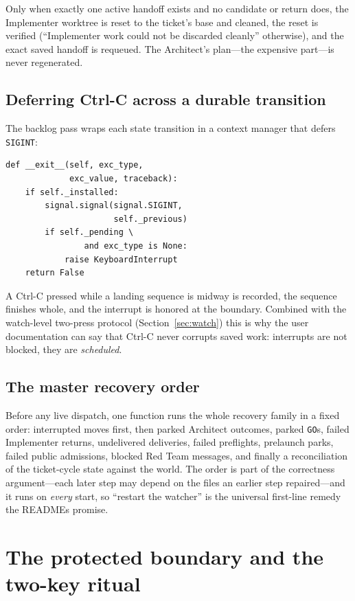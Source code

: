 \documentclass[10pt,aps,prd,twocolumn,nofootinbib]{revtex4-2}
\newcommand{\code}[1]{\texttt{#1}}
\begin{document}
Only when exactly one active handoff exists and no candidate or return
does, the Implementer worktree is reset to the ticket's base and
cleaned, the reset is verified (``Implementer work could not be
discarded cleanly'' otherwise), and the exact saved handoff is
requeued.  The Architect's plan---the expensive part---is never
regenerated.

\subsection{Deferring Ctrl-C across a durable transition}

The backlog pass wraps each state transition in a context manager that
defers \code{SIGINT}:

\begin{verbatim}
def __exit__(self, exc_type,
             exc_value, traceback):
    if self._installed:
        signal.signal(signal.SIGINT,
                      self._previous)
        if self._pending \
                and exc_type is None:
            raise KeyboardInterrupt
    return False
\end{verbatim}

A Ctrl-C pressed while a landing sequence is midway is recorded, the
sequence finishes whole, and the interrupt is honored at the
boundary.  Combined with the watch-level two-press protocol
(Section~\ref{sec:watch}) this is why the user documentation can say
that Ctrl-C never corrupts saved work: interrupts are not blocked,
they are \emph{scheduled}.

\subsection{The master recovery order}

Before any live dispatch, one function runs the whole recovery family
in a fixed order: interrupted moves first, then parked Architect
outcomes, parked \code{GO}s, failed Implementer returns, undelivered
deliveries, failed preflights, prelaunch parks, failed public
admissions, blocked Red Team messages, and finally a reconciliation of
the ticket-cycle state against the world.  The order is part of the
correctness argument---each later step may depend on the files an
earlier step repaired---and it runs on \emph{every} start, so ``restart
the watcher'' is the universal first-line remedy the READMEs promise.

\section{The protected boundary and the two-key ritual}
\label{sec:protected-tools}
\end{document}
